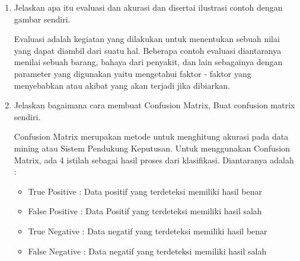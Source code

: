 \begin{enumerate}
\item Jelaskan apa itu evaluasi dan akurasi dan disertai ilustrasi contoh dengan gambar sendiri.\par
Evaluasi adalah kegiatan yang dilakukan untuk menentukan sebuah nilai yang dapat diambil dari suatu hal. Beberapa contoh evaluasi diantaranya menilai sebuah barang, bahaya dari penyakit, dan lain sebagainya dengan parameter yang digunakan yaitu mengetahui faktor - faktor yang menyebabkan atau akibat yang akan terjadi jika dibiarkan. 

\item Jelaskan bagaimana cara membuat Confusion Matrix, Buat confusion matrix sendiri.\par
Confusion Matrix merupakan metode untuk menghitung akurasi pada data mining atau Sistem Pendukung Keputusan. Untuk menggunakan Confusion Matrix, ada 4 istilah sebagai hasil proses dari klasifikasi. Diantaranya adalah :

\begin{itemize}
    \item True Positive : Data positif yang terdeteksi memiliki hasil benar
    \item False Positive : Data Positif yang terdeteksi memiliki hasil salah
    \item True Negative : Data negatif yang terdeteksi memiliki hasil benar
    \item False Negative : Data negatif yang terdeteksi memiliki hasil salah
\end{itemize}



\end{enumerate}
